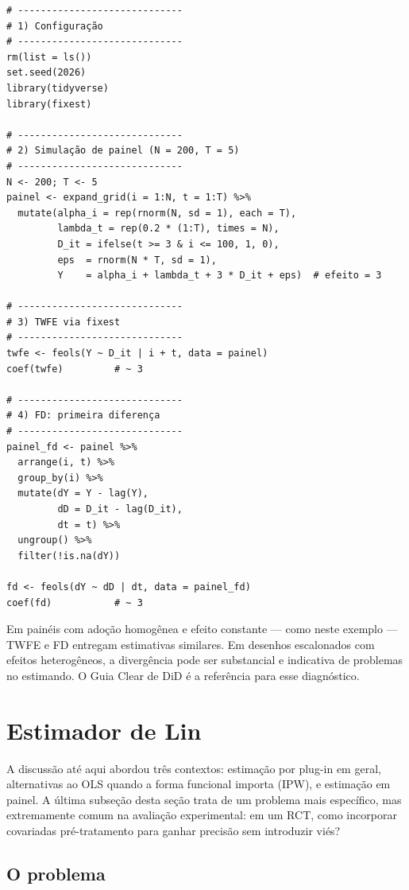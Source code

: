 \begin{lstlisting}[caption={Estimadores TWFE e FD em painel.}, label={lst:painel}]
# -----------------------------
# 1) Configuração
# -----------------------------
rm(list = ls())
set.seed(2026)
library(tidyverse)
library(fixest)

# -----------------------------
# 2) Simulação de painel (N = 200, T = 5)
# -----------------------------
N <- 200; T <- 5
painel <- expand_grid(i = 1:N, t = 1:T) %>%
  mutate(alpha_i = rep(rnorm(N, sd = 1), each = T),
         lambda_t = rep(0.2 * (1:T), times = N),
         D_it = ifelse(t >= 3 & i <= 100, 1, 0),
         eps  = rnorm(N * T, sd = 1),
         Y    = alpha_i + lambda_t + 3 * D_it + eps)  # efeito = 3

# -----------------------------
# 3) TWFE via fixest
# -----------------------------
twfe <- feols(Y ~ D_it | i + t, data = painel)
coef(twfe)         # ~ 3

# -----------------------------
# 4) FD: primeira diferença
# -----------------------------
painel_fd <- painel %>%
  arrange(i, t) %>%
  group_by(i) %>%
  mutate(dY = Y - lag(Y),
         dD = D_it - lag(D_it),
         dt = t) %>%
  ungroup() %>%
  filter(!is.na(dY))

fd <- feols(dY ~ dD | dt, data = painel_fd)
coef(fd)           # ~ 3
\end{lstlisting}

Em painéis com adoção homogênea e efeito constante --- como neste exemplo --- TWFE e FD entregam estimativas similares. Em desenhos escalonados com efeitos heterogêneos, a divergência pode ser substancial e indicativa de problemas no estimando. O Guia Clear de DiD é a referência para esse diagnóstico.


\section{Estimador de Lin}
\label{subsec:lin}

A discussão até aqui abordou três contextos: estimação por plug-in em geral, alternativas ao OLS quando a forma funcional importa (IPW), e estimação em painel. A última subseção desta seção trata de um problema mais específico, mas extremamente comum na avaliação experimental: em um RCT, como incorporar covariadas pré-tratamento para ganhar precisão sem introduzir viés?

\subsection*{O problema}

